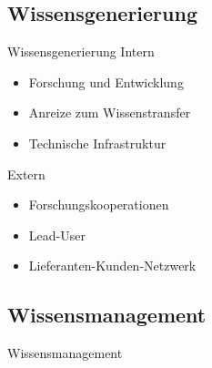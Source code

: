 \documentclass[ngerman,compress,hyperref={bookmarks}]{beamer}
\begin{document}
\subsection{Wissensgenerierung}
\begin{frame}{Wissensgenerierung}
Intern
\begin{itemize}
 \item Forschung und Entwicklung
 \item Anreize zum Wissenstransfer
 \item Technische Infrastruktur
\end{itemize}
Extern
\begin{itemize}
 \item Forschungskooperationen
 \item Lead-User
 \item Lieferanten-Kunden-Netzwerk
\end{itemize}
\end{frame}

\subsection{Wissensmanagement}
\begin{frame}{Wissensmanagement}

\end{frame}
\end{document}
